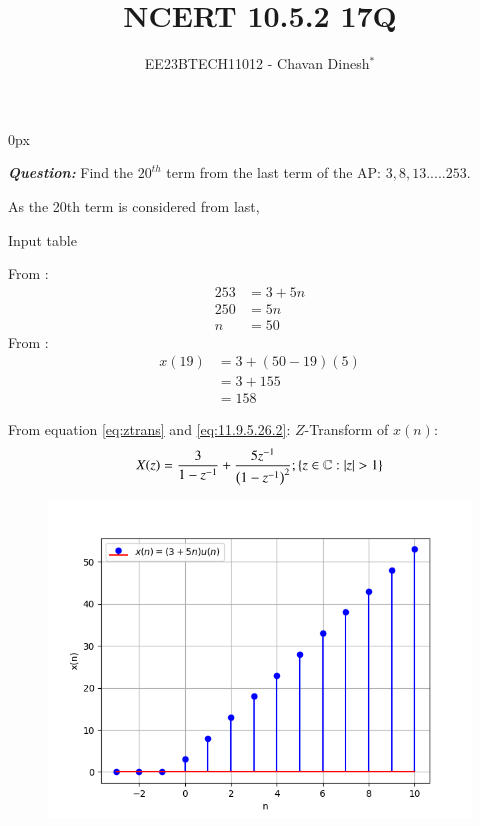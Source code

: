 \documentclass[journal,12pt,twocolumn]{IEEEtran}
\theoremstyle{remark}
\begin{document}
\parindent 0px

\vspace{3cm}

\title{NCERT 10.5.2 17Q}
\author{EE23BTECH11012 - Chavan Dinesh$^{*}$%
}
\maketitle
\newpage
\bigskip

\renewcommand{\thefigure}{\arabic{figure}}
\renewcommand{\thetable}{\arabic{table}}
\large\textbf{\textsl{Question:}}
Find the $20^{th}$ term from the last term of the AP: $3,8,13.....253$.

\solution

As the 20th term is considered from last, 

\begin{table}[htbp]
    \centering
    
    \caption{Input table}
    \label{tab:parameter_table.10.5.2.17}
\end{table}
From :
\begin{align}
    253 &= 3 + 5n \\
    250 &= 5n\\
     n  &= 50
\end{align}
From :
\begin{align}
x(19) &= 3 + (50 - 19)(5)\\
&= 3 + 155\\
&= 158
\end{align}

From equation \eqref{eq:ztrans} and \eqref{eq:11.9.5.26.2}:
\(Z\)-Transform of \(x(n)\):
\begin{align}
 X(z) =\frac{3}{1-z^{-1}}+ \frac{5z^{-1}}{\brak{1-z^{-1}}^2};\cbrak{z\in\mathbb{C} : |z|>1}
\end{align}

\begin{figure}[ht]
    \centering
    \includegraphics[width = \columnwidth]{figs/x(n)_vs_n.png}
    \caption{}
    \label{fig:graph1}
\end{figure}


\end{document}
